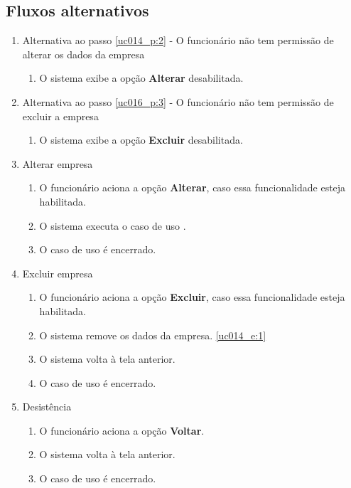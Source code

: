 \subsection{Fluxos alternativos}

\begin{enumerate}[label=A\arabic*]
	\item Alternativa ao passo \ref{uc014_p:2} - O funcionário não tem permissão de alterar os dados da empresa \label{uc014_a:1}
	\begin{enumerate}[label*=.\arabic*]
		\item O sistema exibe a opção \textbf{Alterar} desabilitada.
	\end{enumerate}
	
	\item Alternativa ao passo \ref{uc016_p:3} - O funcionário não tem permissão de excluir a empresa \label{uc014_a:2}
	\begin{enumerate}[label*=.\arabic*]
		\item O sistema exibe a opção \textbf{Excluir} desabilitada.
	\end{enumerate}
	
	\item Alterar empresa
	\begin{enumerate}[label*=.\arabic*]
		\item O funcionário aciona a opção \textbf{Alterar}, caso essa funcionalidade esteja habilitada.
		\item O sistema executa o caso de uso .
		\item O caso de uso é encerrado.
	\end{enumerate}
	
	\item Excluir empresa
	\begin{enumerate}[label*=.\arabic*]
		\item O funcionário aciona a opção \textbf{Excluir}, caso essa funcionalidade esteja habilitada.
		\item O sistema remove os dados da empresa. \label{uc014_a:4:2}\ref{uc014_e:1}
		\item O sistema volta à tela anterior.
		\item O caso de uso é encerrado.
	\end{enumerate}
	
	\item Desistência
	\begin{enumerate}[label*=.\arabic*]
		\item O funcionário aciona a opção \textbf{Voltar}.
		\item O sistema volta à tela anterior.
		\item O caso de uso é encerrado.		
	\end{enumerate}
\end{enumerate}

